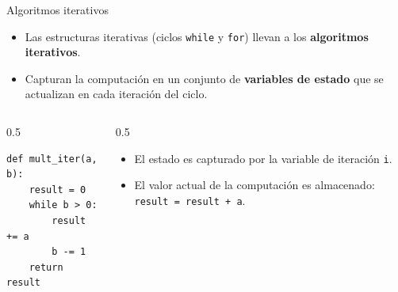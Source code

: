 \documentclass[mathserif]{beamer}
\begin{document}
\begin{frame}[fragile]{Algoritmos iterativos}
    \begin{itemize}
        \item Las estructuras iterativas (ciclos \lstinline|while| y \lstinline|for|) llevan a los {\blue\bfseries algoritmos iterativos}.
        
        \item Capturan la computación en un conjunto de {\blue\bfseries variables de estado} que se actualizan en cada iteración del ciclo.
    \end{itemize}
    
    \begin{columns}
        \begin{column}{0.5\textwidth}
\begin{lstlisting}
def mult_iter(a, b): 
    result = 0
    while b > 0: 
        result += a
        b -= 1
    return result
\end{lstlisting}
        \end{column}
        \begin{column}{0.5\textwidth}
        \begin{itemize}
            \item El estado es capturado por la {\blue variable de iteración} \lstinline|i|. 
            \item El {\blue valor actual de la computación} es almacenado: \lstinline|result = result + a|.
        \end{itemize}
        \end{column}
    \end{columns}
\end{frame}
\end{document}
